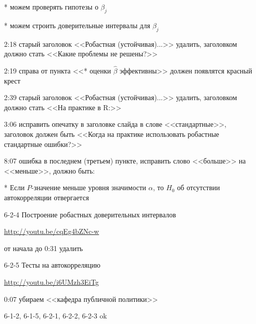 \documentclass[12pt,a4paper]{article}
\begin{document}
* можем проверять гипотезы о $\beta_j$

* можем строить доверительные интервалы для $\beta_j$

2:18 старый заголовок <<Робастная (устойчивая)...>> удалить, заголовком должно стать <<Какие проблемы не решены?>>

2:19 справа от пункта <<* оценки $\hat{\beta}$ эффективны>> должен появлятся красный крест

2:39 старый заголовок <<Робастная (устойчивая)...>> удалить, заголовком должно стать <<На практике в R:>>

3:06 исправить опечатку в заголовке слайда в слове <<стандартные>>, заголовок должен быть <<Когда на практике использовать робастные стандартные ошибки?>>

8:07 ошибка в последнем (третьем) пункте, исправить слово <<больше>> на <<меньше>>, должно быть:

* Если $P$-значение меньше уровня значимости $\alpha$, то $H_0$ об отсутствии автокорреляции отвергается










6-2-4 Построение робастных доверительных интервалов

\url{http://youtu.be/cqEg4bZNc-w}

от начала до 0:31 удалить

6-2-5 Тесты на автокорреляцию

\url{http://youtu.be/i6UMzh3EiTg}

0:07 убираем <<кафедра публичной политики>>

\vspace{1cm}
6-1-2, 6-1-5, 6-2-1, 6-2-2, 6-2-3 ok
\end{document}
